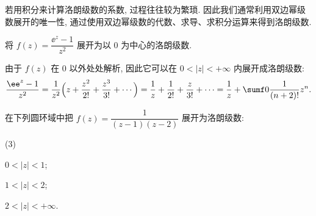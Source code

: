 若用积分来计算洛朗级数的系数, 过程往往较为繁琐.
因此我们通常利用双边幂级数展开的唯一性, 通过\alert{使用双边幂级数的代数、求导、求积分运算}来得到洛朗级数.

\begin{example}
  将 $f(z)=\dfrac{\ee^z-1}{z^2}$ 展开为以 $0$ 为中心的洛朗级数.
\end{example}

\begin{solution}
  由于 $f(z)$ 在 $0$ 以外处处解析, 因此它可以在 $0<|z|<+\infty$ 内展开成洛朗级数:
  \[
     \frac{\ee^z-1}{z^2}
    =\frac1{z^2}\Bigl(z+\frac{z^2}{2!}+\frac{z^3}{3!}+\cdots\Bigr)
    =\frac1z+\frac1{2!}+\frac{z}{3!}+\cdots
    =\frac1z+\sumf0 \frac1{(n+2)!}z^n.
  \]
\end{solution}

\begin{example}
  在下列圆环域中把 $f(z)=\dfrac1{(z-1)(z-2)}$ 展开为洛朗级数:
  \begin{subexample}(3)
    \item $0<|z|<1$;
    \item $1<|z|<2$;
    \item $2<|z|<+\infty$.
  \end{subexample}
\end{example}

